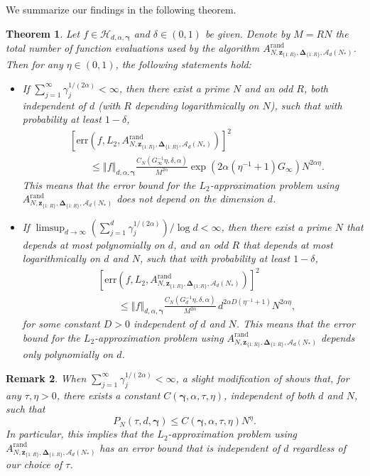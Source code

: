 \documentclass[pdflatex,sn-basic,Numbered]{sn-jnl}%
\newcommand{\rand}{\mathrm{rand}}
\newcommand{\bsz}{\boldsymbol{z}}
\newcommand{\bsgamma}{\boldsymbol{\gamma}}
\newcommand{\bsDelta}{\boldsymbol{\Delta}}
\newcommand{\Acal}{\mathcal{A}}
\newcommand{\Hcal}{\mathcal{H}}
\newcommand{\norm}[1]{\left\Vert#1\right\Vert}
\theoremstyle{thmstyleone}%
\newtheorem{theorem}{Theorem}%
\newtheorem{remark}[theorem]{Remark}
\theoremstyle{thmstyletwo}%
\begin{document}
We summarize our findings in the following theorem.
\begin{theorem}\label{thm:error_bound}
    Let $f\in\Hcal_{d,\alpha,\bsgamma}$ and $\delta \in (0,1)$ be given. Denote by $M = RN$ the total number of function evaluations used by the algorithm $A^{\rand}_{N,\bsz_{\{1{:}R\}},\bsDelta_{\{1{:}R\}},\Acal_d(N_*)}$. Then for any $\eta \in (0,1)$, the following statements hold:
    \begin{itemize}
    \item If $\sum_{j=1}^\infty \gamma_j^{1/(2\alpha)} < \infty$, then there exist a prime $N$ and an odd $R$, both independent of $d$ (with $R$ depending logarithmically on $N$), such that with probability at least $1 - \delta$, 
    \begin{align*}
     & [\mathrm{err}(f, L_2, A^{\rand}_{N,\bsz_{\{1{:}R\}},\bsDelta_{\{1{:}R\}},\Acal_d(N_*)})]^2\\
    & \qquad \le \norm{f}_{d,\alpha,\bsgamma}\frac{C_N( G^{-1}_\infty \eta ,\delta,\alpha) }{M^{2\alpha}}
    \exp(2\alpha(\eta^{-1}+1) G_\infty)  N^{2\alpha\eta}.
    \end{align*}
    This means that the error bound for the $L_2$-approximation problem using $ A^{\rand}_{N,\bsz_{\{1{:}R\}},\bsDelta_{\{1{:}R\}},\Acal_d(N_*)}$ does not depend on the dimension $d$.

    \item If $\displaystyle \limsup_{d \to \infty} \left(\sum_{j=1}^d \gamma_j^{1/(2\alpha)}\right)/\log d < \infty$, then there exist a prime $N$ that depends at most polynomially on $d$, and an odd $R$ that depends at most logarithmically on $d$ and $N$, such that with probability at least $1 - \delta$,
    \begin{align*}
    & [\mathrm{err}(f, L_2, A^{\rand}_{N,\bsz_{\{1{:}R\}},\bsDelta_{\{1{:}R\}},\Acal_d(N_*)})]^2 \\
    & \qquad \le \norm{f}_{d,\alpha,\bsgamma}\frac{C_N( G^{-1}_d \eta ,\delta,\alpha) }{M^{2\alpha}}\,
    d^{2\alpha D(\eta^{-1}+1)} N^{2\alpha\eta},
    \end{align*}
    for some constant $D > 0$ independent of $d$ and $N$.
    This means that the error bound for the $L_2$-approximation problem using $ A^{\rand}_{N,\bsz_{\{1{:}R\}},\bsDelta_{\{1{:}R\}},\Acal_d(N_*)}$ depends only polynomially on $d$.
\end{itemize}
\end{theorem}


\begin{remark}
    When  $\sum_{j=1}^\infty \gamma_j^{1/(2\alpha)} < \infty$, a slight modification of \cite[Lemma 3]{hickernell2003existence} shows that, for any  $\tau,\eta>0$, there exists a constant $C(\bsgamma, \alpha, \tau, \eta)$, independent of both $d$ and $N$, such that
    \[
    P_N (\tau,d,\bsgamma) \le C(\bsgamma, \alpha, \tau, \eta) N^{\eta}.
    \]
    In particular, this implies that the $L_2$-approximation problem using $ A^{\rand}_{N,\bsz_{\{1{:}R\}},\bsDelta_{\{1{:}R\}},\Acal_d(N_*)}$ has an error bound that is independent of $d$ regardless of our choice of $\tau$.
\end{remark}
\end{document}

